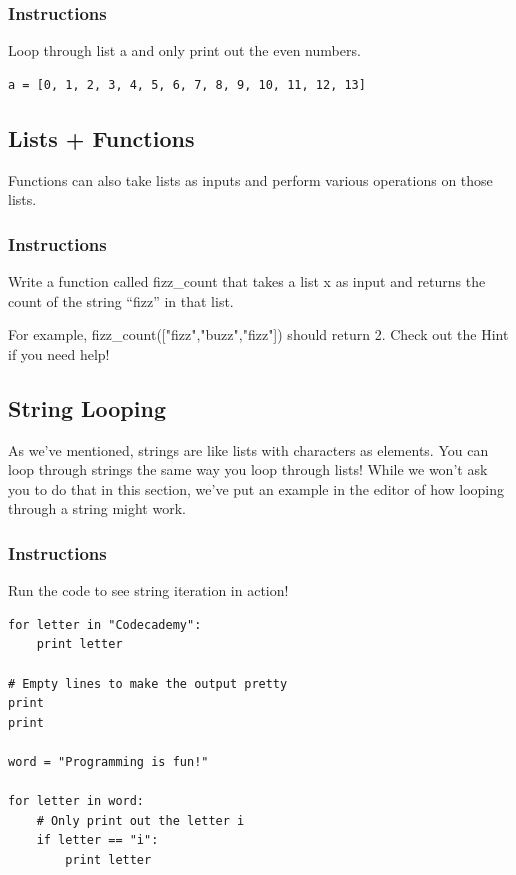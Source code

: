\documentclass[12pt,a4paper,final,twoside,onecolumn,titlepage]{book}
\begin{document}
\subsubsection{Instructions}

Loop through list a and only print out the even numbers.
\begin{lstlisting}
a = [0, 1, 2, 3, 4, 5, 6, 7, 8, 9, 10, 11, 12, 13]
\end{lstlisting}

\subsection{Lists + Functions}

Functions can also take lists as inputs and perform various operations on those lists.
\subsubsection{Instructions}

Write a function called fizz\_count that takes a list x as input and returns the count of the string “fizz” in that list.

For example, fizz\_count(["fizz","buzz","fizz"]) should return 2. Check out the Hint if you need help!

\subsection{String Looping}

As we've mentioned, strings are like lists with characters as elements. You can loop through strings the same way you loop through lists! While we won't ask you to do that in this section, we've put an example in the editor of how looping through a string might work.
\subsubsection{Instructions}

Run the code to see string iteration in action!

\begin{lstlisting}
for letter in "Codecademy":
    print letter
    
# Empty lines to make the output pretty
print
print

word = "Programming is fun!"

for letter in word:
    # Only print out the letter i
    if letter == "i":
        print letter
\end{lstlisting}
\end{document}
